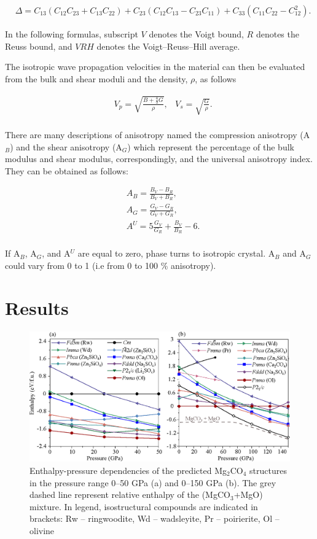 \documentclass[a4paperm]{article}
\begin{document}
 \begin{align*}
 	&\Delta=C_{13}(C_{12}C_{23}+C_{13}C_{22})+C_{23}(C_{12}C_{13}-C_{23}C_{11})+C_{33}(C_{11}C_{22}-C^2_{12}).
 \end{align*}
 
In the following formulas, subscript $V$ denotes the Voigt bound, $R$ denotes the Reuss bound, and $VRH$ denotes the Voigt–Reuss–Hill average.

The isotropic wave propagation velocities in the material can then be evaluated from the bulk and shear moduli and the density, $\rho$, as follows

\begin{align*}
  & V_p=\sqrt{\frac{B+\frac{4}{3}G}{\rho}},
  &V_s = \sqrt{\frac{G}{\rho}}. \\	
\end{align*}

There are many descriptions of anisotropy named the compression anisotropy (A$_B$) and the shear anisotropy (A$_G$) which represent the percentage of the bulk modulus and shear modulus, correspondingly, and the universal anisotropy index. They can be obtained as follows:

\begin{align*}
	&A_B=\frac{B_V-B_R}{B_V+B_R}, \\
	&A_G=\frac{G_V-G_R}{G_V+G_R}, \\
	&A^U=5\frac{G_V}{G_R}+\frac{B_V}{B_R}-6  .  \\
\end{align*}

If A$_B$, A$_G$, and A$^U$ are equal to zero, phase turns to isotropic crystal. A$_B$ and A$_G$ could vary from 0 to 1 (i.e from 0 to 100 \% anisotropy).


\section*{Results}


\begin{figure}[H]
	\includegraphics[width=\textwidth]{vs_Mg2CO4_for_suppl} \centering
	\caption{Enthalpy-pressure dependencies of the predicted Mg$_2$CO$_4$ structures in the pressure range 0--50 GPa (a) and 0--150 GPa (b). The grey dashed line represent relative enthalpy of the (MgCO$_3$+MgO) mixture. In legend, isostructural compounds are indicated in brackets: Rw -- ringwoodite, Wd -- wadsleyite, Pr -- poirierite, Ol -- olivine} 
\label{E-P_supp}
\end{figure}
\end{document}
